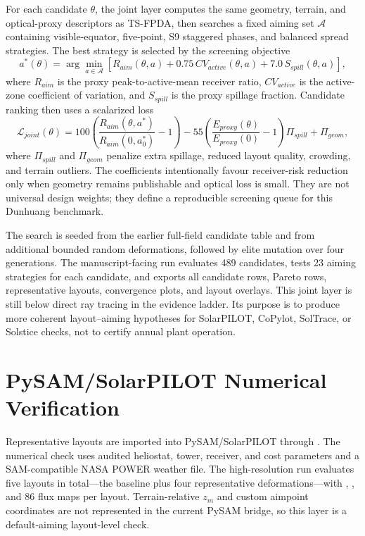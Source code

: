 \documentclass[final,3p,times]{elsarticle}
\begin{document}
For each candidate $\theta$, the joint layer computes the same geometry, terrain, and optical-proxy descriptors as TS-FPDA, then searches a fixed aiming set $\mathcal{A}$ containing visible-equator, five-point, S9 staggered phases, and balanced spread strategies. The best strategy is selected by the screening objective
\begin{equation}
a^*(\theta)=\arg\min_{a\in\mathcal{A}}\left[
R_{aim}(\theta,a)+0.75\,CV_{active}(\theta,a)+7.0\,S_{spill}(\theta,a)
\right],
\end{equation}
where $R_{aim}$ is the proxy peak-to-active-mean receiver ratio, $CV_{active}$ is the active-zone coefficient of variation, and $S_{spill}$ is the proxy spillage fraction. Candidate ranking then uses a scalarized loss
\begin{equation}
\mathcal{L}_{joint}(\theta)=100\left(\frac{R_{aim}(\theta,a^*)}{R_{aim}(0,a_0^*)}-1\right)
-55\left(\frac{E_{proxy}(\theta)}{E_{proxy}(0)}-1\right)
\Pi_{spill}+\Pi_{geom},
\end{equation}
where $\Pi_{spill}$ and $\Pi_{geom}$ penalize extra spillage, reduced layout quality, crowding, and terrain outliers. The coefficients intentionally favour receiver-risk reduction only when geometry remains publishable and optical loss is small. They are not universal design weights; they define a reproducible screening queue for this Dunhuang benchmark.

The search is seeded from the earlier full-field candidate table and from additional bounded random deformations, followed by elite mutation over four generations. The manuscript-facing run evaluates 489 candidates, tests 23 aiming strategies for each candidate, and exports all candidate rows, Pareto rows, representative layouts, convergence plots, and layout overlays. This joint layer is still below direct ray tracing in the evidence ladder. Its purpose is to produce more coherent layout--aiming hypotheses for SolarPILOT, CoPylot, SolTrace, or Solstice checks, not to certify annual plant operation.

\section{PySAM/SolarPILOT Numerical Verification}
Representative layouts are imported into PySAM/SolarPILOT through . The numerical check uses audited heliostat, tower, receiver, and cost parameters and a SAM-compatible NASA POWER weather file. The high-resolution run evaluates five layouts in total---the baseline plus four representative deformations---with , , and 86 flux maps per layout. Terrain-relative $z_m$ and custom aimpoint coordinates are not represented in the current PySAM bridge, so this layer is a default-aiming layout-level check.
\end{document}
